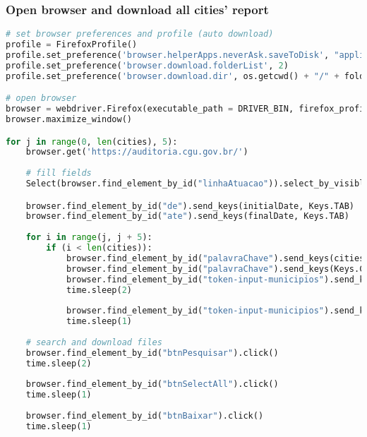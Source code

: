 \subsubsection{Open browser and download all cities'
report}\label{open-browser-and-download-all-cities-report}

\begin{lstlisting}[language=Python]
# set browser preferences and profile (auto download)
profile = FirefoxProfile()
profile.set_preference('browser.helperApps.neverAsk.saveToDisk', "application/pdf,application/zip")
profile.set_preference('browser.download.folderList', 2)
profile.set_preference('browser.download.dir', os.getcwd() + "/" + folder)

# open browser
browser = webdriver.Firefox(executable_path = DRIVER_BIN, firefox_profile = profile)
browser.maximize_window()

for j in range(0, len(cities), 5):
    browser.get('https://auditoria.cgu.gov.br/')
    
    # fill fields
    Select(browser.find_element_by_id("linhaAtuacao")).select_by_visible_text('Fiscalização em Entes Federativos - Municípios')

    browser.find_element_by_id("de").send_keys(initialDate, Keys.TAB)
    browser.find_element_by_id("ate").send_keys(finalDate, Keys.TAB)
    
    for i in range(j, j + 5):
        if (i < len(cities)):
            browser.find_element_by_id("palavraChave").send_keys(cities[i], Keys.COMMAND, 'a')
            browser.find_element_by_id("palavraChave").send_keys(Keys.COMMAND, 'x')
            browser.find_element_by_id("token-input-municipios").send_keys(Keys.COMMAND, 'v')
            time.sleep(2)
            
            browser.find_element_by_id("token-input-municipios").send_keys(Keys.ENTER)
            time.sleep(1)
    
    # search and download files
    browser.find_element_by_id("btnPesquisar").click()
    time.sleep(2)
    
    browser.find_element_by_id("btnSelectAll").click()
    time.sleep(1)
    
    browser.find_element_by_id("btnBaixar").click()
    time.sleep(1)
\end{lstlisting}
